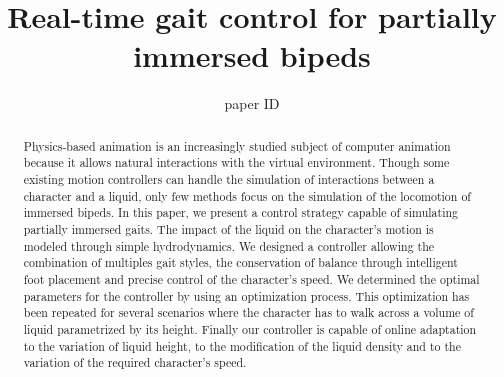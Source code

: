\documentclass[conference]{acmsiggraph}
\title{Real-time gait control for partially immersed bipeds}
\author{paper ID}
\begin{document}

\maketitle

\begin{abstract}

Physics-based animation is an increasingly studied subject of computer animation because it allows natural interactions with the virtual environment. Though some existing motion controllers can handle the simulation of interactions between a character and a liquid, only few methods focus on the simulation of the locomotion of immersed bipeds. In this paper, we present a control strategy capable of simulating partially immersed gaits. The impact of the liquid on the character's motion is modeled through simple hydrodynamics. We designed a controller allowing the combination of multiples gait styles, the conservation of balance through intelligent foot placement and precise control of the character's speed. We determined the optimal parameters for the controller by using an optimization process. This optimization has been repeated for several scenarios where the character has to walk across a volume of liquid parametrized by its height. Finally our controller is capable of online adaptation to the variation of liquid height, to the modification of the liquid density and to the variation of the required character's speed.

\end{abstract}

\begin{CRcatlist}
\end{CRcatlist}
\end{document}
